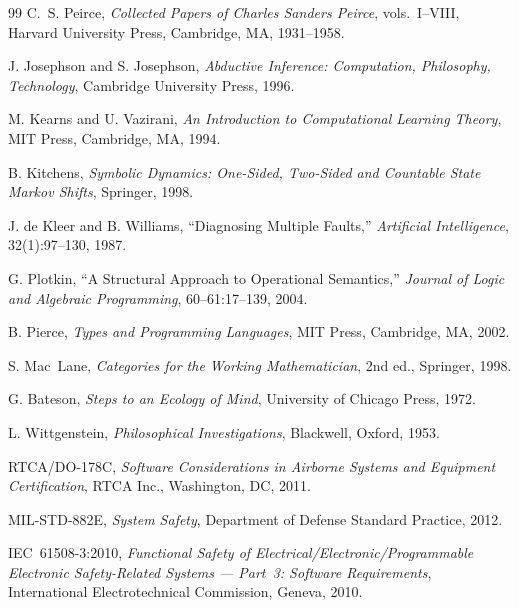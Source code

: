 \documentclass[11pt,a4paper]{article}
\theoremstyle{plain}
\theoremstyle{definition}
\theoremstyle{remark}
\begin{document}
\begin{thebibliography}{99}
C.~S. Peirce, \textit{Collected Papers of Charles Sanders Peirce}, vols.~I--VIII,
Harvard University Press, Cambridge, MA, 1931--1958.

J. Josephson and S. Josephson, \textit{Abductive Inference: Computation, Philosophy, Technology},
Cambridge University Press, 1996.

M. Kearns and U. Vazirani, \textit{An Introduction to Computational Learning Theory},
MIT Press, Cambridge, MA, 1994.

B. Kitchens, \textit{Symbolic Dynamics: One-Sided, Two-Sided and Countable State Markov Shifts},
Springer, 1998.

J. de Kleer and B. Williams, ``Diagnosing Multiple Faults,''
\textit{Artificial Intelligence}, 32(1):97--130, 1987.

G. Plotkin, ``A Structural Approach to Operational Semantics,''
\textit{Journal of Logic and Algebraic Programming}, 60--61:17--139, 2004.

B. Pierce, \textit{Types and Programming Languages}, MIT Press, Cambridge, MA, 2002.

S. Mac~Lane, \textit{Categories for the Working Mathematician}, 2nd ed., Springer, 1998.

G. Bateson, \textit{Steps to an Ecology of Mind}, University of Chicago Press, 1972.

L. Wittgenstein, \textit{Philosophical Investigations}, Blackwell, Oxford, 1953.

RTCA/DO-178C, \textit{Software Considerations in Airborne Systems and Equipment Certification},
RTCA Inc., Washington, DC, 2011.

MIL-STD-882E, \textit{System Safety}, Department of Defense Standard Practice, 2012.

IEC~61508-3:2010, \textit{Functional Safety of Electrical/Electronic/Programmable Electronic
Safety-Related Systems --- Part~3: Software Requirements}, International Electrotechnical
Commission, Geneva, 2010.

\end{thebibliography}

\appendix
\end{document}
